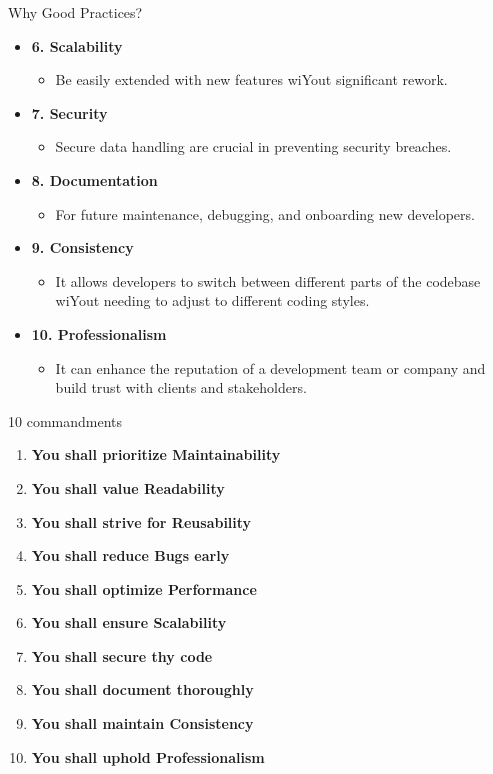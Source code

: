 \documentclass[10pt]{beamer}
\begin{document}
\begin{frame}{Why Good Practices?}
  \begin{itemize}
    \item \textbf{6. Scalability}
    \begin{itemize}
      \item Be easily extended with new features wiYout significant rework.
    \end{itemize}
    \item \textbf{7. Security}
    \begin{itemize}
      \item Secure data handling are crucial in preventing security breaches.
    \end{itemize}
    \item \textbf{8. Documentation}
    \begin{itemize}
      \item For future maintenance, debugging, and onboarding new developers.
    \end{itemize}
    \item \textbf{9. Consistency}
    \begin{itemize}
      \item It allows developers to switch between different parts of the codebase wiYout needing to adjust to different coding styles.
    \end{itemize}
    \item \textbf{10. Professionalism}
    \begin{itemize}
      \item It can enhance the reputation of a development team or company and build trust with clients and stakeholders.
    \end{itemize}
  \end{itemize}
\end{frame}


\begin{frame}{10 commandments}
  \begin{enumerate}
    \item \textbf{You shall prioritize Maintainability}
    \item \textbf{You shall value Readability}
    \item \textbf{You shall strive for Reusability}
    \item \textbf{You shall reduce Bugs early}
    \item \textbf{You shall optimize Performance}
    \item \textbf{You shall ensure Scalability}
    \item \textbf{You shall secure thy code}
    \item \textbf{You shall document thoroughly}
    \item \textbf{You shall maintain Consistency}
    \item \textbf{You shall uphold Professionalism}
  \end{enumerate}
\end{frame}
\end{document}
